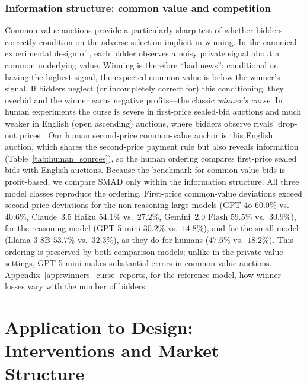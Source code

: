 \documentclass[acmsmall,screen,review]{acmart}
\newcommand{\rev}[1]{{\color{blue}#1}}
\newcommand{\rev}[1]{#1}
\begin{document}
\subsubsection{\texorpdfstring{Information structure: common value and competition}{Information structure: common value and competition}}

Common-value auctions provide a particularly sharp test of whether bidders correctly condition on the adverse selection implicit in winning. In the canonical experimental design of \citet{kagel1986winner}, each bidder observes a noisy private signal about a common underlying value. Winning is therefore ``bad news'': conditional on having the highest signal, the expected common value is below the winner's signal. If bidders neglect (or incompletely correct for) this conditioning, they overbid and the winner earns negative profits---the classic \emph{winner's curse}. \rev{In human experiments the curse is severe in first-price sealed-bid auctions \citep{kagel1986winner} and much weaker in English (open ascending) auctions, where bidders observe rivals' drop-out prices \citep{levin1996revenue}. Our human second-price common-value anchor is this English auction, which shares the second-price payment rule but also reveals information (Table~\ref{tab:human_sources}), so the human ordering compares first-price sealed bids with English auctions.} Because the benchmark for common-value bids is profit-based, we compare SMAD only within the information structure. All three model classes reproduce the ordering. First-price common-value deviations exceed second-price deviations for the non-reasoning large models (GPT-4o $60.0\%$ vs.\ $40.6\%$, Claude~3.5 Haiku $54.1\%$ vs.\ $27.2\%$, Gemini~2.0 Flash $59.5\%$ vs.\ $30.9\%$), for the reasoning model (GPT-5-mini $30.2\%$ vs.\ $14.8\%$), and for the small model (Llama-3-8B $53.7\%$ vs.\ $32.3\%$), as they do for humans ($47.6\%$ vs.\ $18.2\%$). This ordering is preserved by both comparison models; unlike in the private-value settings, GPT-5-mini makes substantial errors in common-value auctions. Appendix~\ref{app:winners_curse} reports, for the reference model, how winner losses vary with the number of bidders.


\section{\texorpdfstring{Application to Design: Interventions and Market Structure}{Application to Design: Interventions and Market Structure}}\label{session:ebay}
\end{document}
